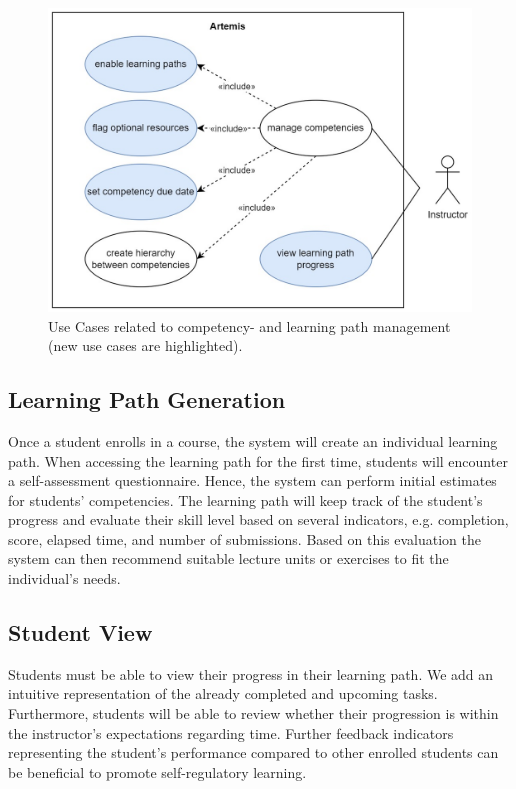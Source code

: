 \documentclass[a4paper,12pt,twoside]{article}
\begin{document}
\begin{figure}[h!]
        \centering
        \includegraphics[width=0.9\linewidth]{figures/UseCasesInstructor.jpg}
        \caption{Use Cases related to competency- and learning path management (new use cases are highlighted).}
        \label{fig:UseCasesInstructor}
\end{figure}

\subsection{Learning Path Generation}
Once a student enrolls in a course, the system will create an individual learning path. When accessing the learning path for the first time,
students will encounter a self-assessment questionnaire. Hence, the system can perform initial estimates for students' competencies.
The learning path will keep track of the student's progress and evaluate their skill level based on several indicators, e.g. completion, score,
elapsed time, and number of submissions. Based on this evaluation the system can then recommend suitable lecture units or exercises to fit the
individual's needs.

\subsection{Student View}
Students must be able to view their progress in their learning path. We add an intuitive representation of the already completed and upcoming tasks.
Furthermore, students will be able to review whether their progression is within the instructor's expectations regarding time. Further feedback indicators
representing the student's performance compared to other enrolled students can be beneficial to promote self-regulatory learning.
\end{document}
